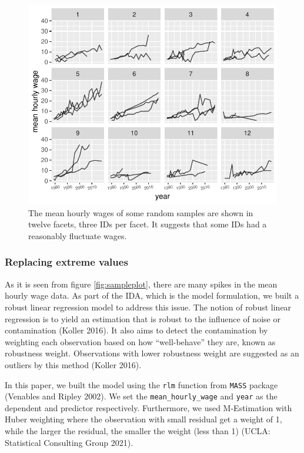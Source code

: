 \documentclass{article}
\begin{document}
\begin{figure}
\centering
\includegraphics{figures/sampleplot-1.pdf}
\caption{The mean hourly wages of some random samples are shown in twelve facets, three IDs per facet. It suggests that some IDs had a reasonably fluctuate wages.}
\end{figure}

\hypertarget{replacing-extreme-values}{%
\subsubsection{Replacing extreme values}\label{replacing-extreme-values}}

As it is seen from figure \ref{fig:sampleplot}, there are many spikes in the mean hourly wage data. As part of the IDA, which is the model formulation, we built a robust linear regression model to address this issue. The notion of robust linear regression is to yield an estimation that is robust to the influence of noise or contamination (Koller 2016). It also aims to detect the contamination by weighting each observation based on how ``well-behave'' they are, known as robustness weight. Observations with lower robustness weight are suggested as an outliers by this method (Koller 2016).

In this paper, we built the model using the \texttt{rlm} function from \texttt{MASS} package (Venables and Ripley 2002). We set the \texttt{mean\_hourly\_wage} and \texttt{year} as the dependent and predictor respectively. Furthermore, we used M-Estimation with Huber weighting where the observation with small residual get a weight of 1, while the larger the residual, the smaller the weight (less than 1) (UCLA: Statistical Consulting Group 2021).
\end{document}

